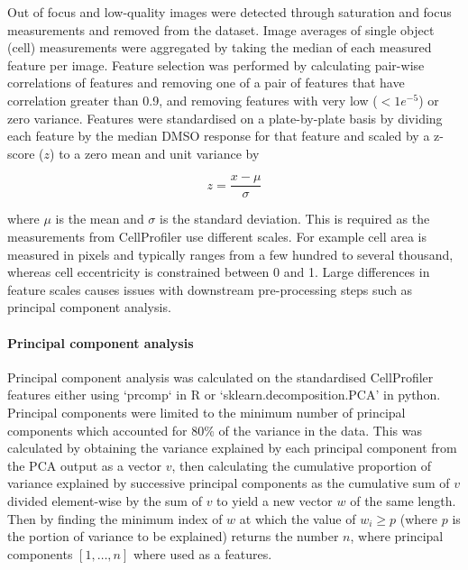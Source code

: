 \documentclass[a4paper,11pt,twoside,openright]{scrbook}
\begin{document}
Out of focus and low-quality images were detected through saturation and focus measurements and removed from the 
dataset.
Image averages of single object (cell) measurements were aggregated by taking the median of each measured feature per 
image.
Feature selection was performed by calculating pair-wise correlations of features and removing one of a pair of 
features that have correlation greater than 0.9, and removing features with very low ($< 1e^{-5}$) or zero variance.
Features were standardised on a plate-by-plate basis by dividing each feature by the median DMSO response for that 
feature and scaled by a z-score ($z$) to a zero mean and unit variance by

\begin{equation} \label{eq:zscore}
    z = \frac{x - \mu}{\sigma}
\end{equation}

where $\mu$ is the mean and $\sigma$ is the standard deviation.
This is required as the measurements from CellProfiler use different scales.
For example cell area is measured in pixels and typically ranges from a few hundred to several thousand, whereas cell 
eccentricity is constrained between 0 and 1.
Large differences in feature scales causes issues with downstream pre-processing steps such as principal component 
analysis.

\paragraph{Principal component analysis}
Principal component analysis was calculated on the standardised CellProfiler features either using `prcomp` in R or 
`sklearn.decomposition.PCA' in python.
Principal components were limited to the minimum number of principal components which accounted for 80\% of the 
variance in the data.
This was calculated by obtaining the variance explained by each principal component from the PCA output as a vector 
$v$, then calculating the cumulative proportion of variance explained by successive principal components as the 
cumulative sum of $v$ divided element-wise by the sum of $v$ to yield a new vector $w$ of the same length.
Then by finding the minimum index of $w$ at which the value of $w_i \geq p$ (where $p$ is the portion of variance to be 
explained) returns the number $n$, where principal components $[1, \dots, n]$ where used as a features.
\end{document}
